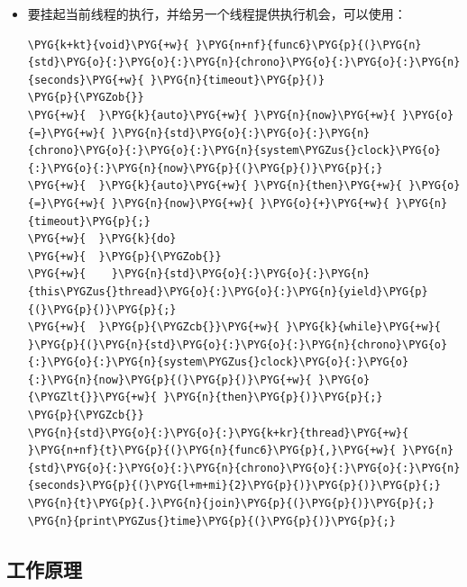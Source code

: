 \begin{itemize}

\item 要挂起当前线程的执行，并给另一个线程提供执行机会，可以使用：



\begin{codeblockbg}
\begin{Verbatim}[commandchars=\\\{\},breaklines=true,breakanywhere=true,fontsize=\codefont,xleftmargin=17bp]
\PYG{k+kt}{void}\PYG{+w}{ }\PYG{n+nf}{func6}\PYG{p}{(}\PYG{n}{std}\PYG{o}{:}\PYG{o}{:}\PYG{n}{chrono}\PYG{o}{:}\PYG{o}{:}\PYG{n}{seconds}\PYG{+w}{ }\PYG{n}{timeout}\PYG{p}{)}
\PYG{p}{\PYGZob{}}
\PYG{+w}{  }\PYG{k}{auto}\PYG{+w}{ }\PYG{n}{now}\PYG{+w}{ }\PYG{o}{=}\PYG{+w}{ }\PYG{n}{std}\PYG{o}{:}\PYG{o}{:}\PYG{n}{chrono}\PYG{o}{:}\PYG{o}{:}\PYG{n}{system\PYGZus{}clock}\PYG{o}{:}\PYG{o}{:}\PYG{n}{now}\PYG{p}{(}\PYG{p}{)}\PYG{p}{;}
\PYG{+w}{  }\PYG{k}{auto}\PYG{+w}{ }\PYG{n}{then}\PYG{+w}{ }\PYG{o}{=}\PYG{+w}{ }\PYG{n}{now}\PYG{+w}{ }\PYG{o}{+}\PYG{+w}{ }\PYG{n}{timeout}\PYG{p}{;}
\PYG{+w}{  }\PYG{k}{do}
\PYG{+w}{  }\PYG{p}{\PYGZob{}}
\PYG{+w}{    }\PYG{n}{std}\PYG{o}{:}\PYG{o}{:}\PYG{n}{this\PYGZus{}thread}\PYG{o}{:}\PYG{o}{:}\PYG{n}{yield}\PYG{p}{(}\PYG{p}{)}\PYG{p}{;}
\PYG{+w}{  }\PYG{p}{\PYGZcb{}}\PYG{+w}{ }\PYG{k}{while}\PYG{+w}{ }\PYG{p}{(}\PYG{n}{std}\PYG{o}{:}\PYG{o}{:}\PYG{n}{chrono}\PYG{o}{:}\PYG{o}{:}\PYG{n}{system\PYGZus{}clock}\PYG{o}{:}\PYG{o}{:}\PYG{n}{now}\PYG{p}{(}\PYG{p}{)}\PYG{+w}{ }\PYG{o}{\PYGZlt{}}\PYG{+w}{ }\PYG{n}{then}\PYG{p}{)}\PYG{p}{;}
\PYG{p}{\PYGZcb{}}
\PYG{n}{std}\PYG{o}{:}\PYG{o}{:}\PYG{k+kr}{thread}\PYG{+w}{ }\PYG{n+nf}{t}\PYG{p}{(}\PYG{n}{func6}\PYG{p}{,}\PYG{+w}{ }\PYG{n}{std}\PYG{o}{:}\PYG{o}{:}\PYG{n}{chrono}\PYG{o}{:}\PYG{o}{:}\PYG{n}{seconds}\PYG{p}{(}\PYG{l+m+mi}{2}\PYG{p}{)}\PYG{p}{)}\PYG{p}{;}
\PYG{n}{t}\PYG{p}{.}\PYG{n}{join}\PYG{p}{(}\PYG{p}{)}\PYG{p}{;}
\PYG{n}{print\PYGZus{}time}\PYG{p}{(}\PYG{p}{)}\PYG{p}{;}
\end{Verbatim}
\end{codeblockbg}


\end{itemize}



\subsection{工作原理}




